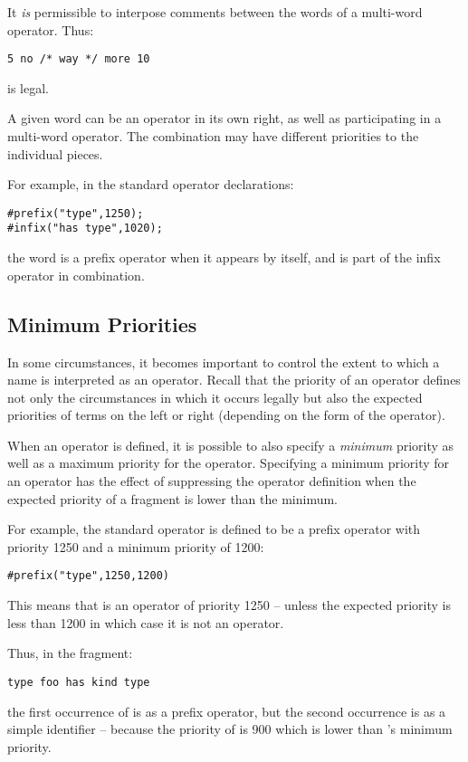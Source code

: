 \begin{aside}
It \emph{is} permissible to interpose comments between the words of a multi-word operator. Thus:
\begin{lstlisting}
5 no /* way */ more 10
\end{lstlisting}
is legal.
\end{aside}

\begin{aside}
A given word can be an operator in its own right, as well as participating in a multi-word operator. The combination may have different priorities to the individual pieces.

For example, in the standard operator declarations:
\begin{lstlisting}
#prefix("type",1250);
#infix("has type",1020);
\end{lstlisting}
the word  is a prefix operator when it appears by itself, and is part of the infix operator  in combination.
\end{aside}

\subsection{Minimum Priorities}
In some circumstances, it becomes important to control the extent to which a name is interpreted as an operator. Recall that the priority of an operator defines not only the circumstances in which it occurs legally but also the expected priorities of terms on the left or right (depending on the form of the operator).

When an operator is defined, it is possible to also specify a \emph{minimum} priority as well as a maximum priority for the operator. Specifying a minimum priority for an operator has the effect of suppressing the operator definition when the expected priority of a fragment is lower than the minimum.

For example, the  standard operator is defined to be a prefix operator with priority 1250 and a minimum priority of 1200:
\begin{lstlisting}
#prefix("type",1250,1200)
\end{lstlisting}
This means that  is an operator of priority 1250 -- unless the expected priority is less than 1200 in which case it is not an operator.

Thus, in the fragment:
\begin{lstlisting}
type foo has kind type
\end{lstlisting}
the first occurrence of  is as a prefix operator, but the second occurrence is as a simple identifier -- because the priority of  is 900 which is lower than 's minimum priority.

